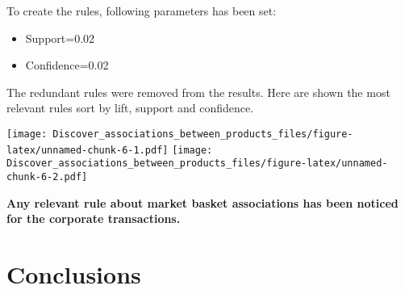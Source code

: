 \documentclass[]{article}
\providecommand{\tightlist}{%
  \setlength{\itemsep}{0pt}\setlength{\parskip}{0pt}}
\begin{document}
To create the rules, following parameters has been set:

\begin{itemize}
\tightlist
\item
  Support=0.02
\item
  Confidence=0.02
\end{itemize}

The redundant rules were removed from the results. Here are shown the
most relevant rules sort by lift, support and confidence.

\texttt{[image: Discover\_associations\_between\_products\_files/figure-latex/unnamed-chunk-6-1.pdf]}
\texttt{[image: Discover\_associations\_between\_products\_files/figure-latex/unnamed-chunk-6-2.pdf]}

\textbf{Any relevant rule about market basket associations has been
noticed for the corporate transactions.}

\hypertarget{conclusions}{%
\section{Conclusions}\label{conclusions}}
\end{document}
